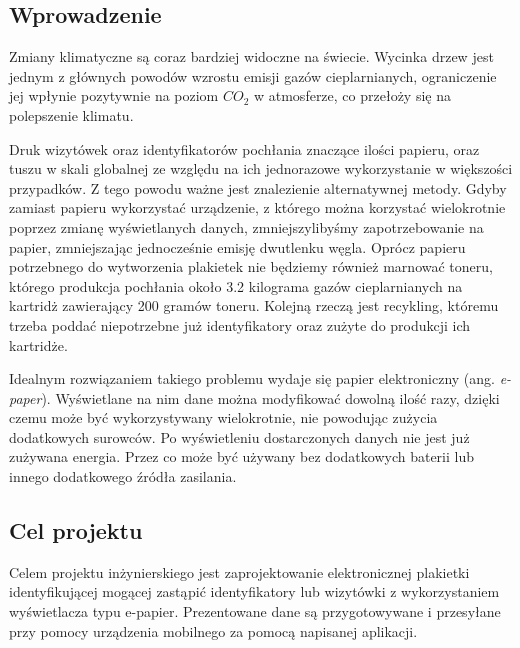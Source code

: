 \documentclass[a4paper,12pt, twoside]{article}
\begin{document}
	\subsection{Wprowadzenie}
	Zmiany klimatyczne są coraz bardziej widoczne na świecie. Wycinka drzew jest jednym z głównych powodów wzrostu emisji gazów cieplarnianych\cite{clima_causes}, ograniczenie jej wpłynie pozytywnie na poziom ${CO_{2}}$ w atmosferze, co przełoży się na polepszenie klimatu. 
	
	Druk wizytówek oraz identyfikatorów pochłania znaczące ilości papieru, oraz tuszu w skali globalnej ze względu na ich jednorazowe wykorzystanie w większości przypadków. Z tego powodu ważne jest znalezienie alternatywnej metody. Gdyby zamiast papieru wykorzystać urządzenie, z którego można korzystać wielokrotnie poprzez zmianę wyświetlanych danych, zmniejszylibyśmy zapotrzebowanie na papier, zmniejszając jednocześnie emisję dwutlenku węgla. Oprócz papieru potrzebnego do wytworzenia plakietek nie będziemy również marnować toneru, którego produkcja pochłania około 3.2 kilograma gazów cieplarnianych\cite{cartidge_production} na kartridż zawierający 200 gramów toneru. Kolejną rzeczą jest recykling, któremu trzeba poddać niepotrzebne już identyfikatory oraz zużyte do produkcji ich kartridże.
	
	Idealnym rozwiązaniem takiego problemu wydaje się papier elektroniczny (ang. \textit{e-paper}). Wyświetlane na nim dane można modyfikować dowolną ilość razy, dzięki czemu może być wykorzystywany wielokrotnie, nie powodując zużycia dodatkowych surowców. Po wyświetleniu dostarczonych danych nie jest już zużywana energia. Przez co może być używany bez dodatkowych baterii lub innego dodatkowego źródła zasilania.
	\newpage
	
	
	\subsection{Cel projektu}
	Celem projektu inżynierskiego jest zaprojektowanie elektronicznej plakietki identyfikującej mogącej zastąpić identyfikatory lub wizytówki z wykorzystaniem wyświetlacza typu e-papier. Prezentowane dane są przygotowywane i przesyłane przy pomocy urządzenia mobilnego za pomocą napisanej aplikacji.
\end{document}
